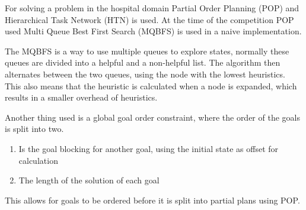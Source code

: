 \documentclass[Main]{subfiles}
\begin{document}
For solving a problem in the hospital domain Partial Order Planning (POP) and Hierarchical Task Network (HTN) is used. At the time of the competition POP used Multi Queue Best First Search (MQBFS) is used in a naive implementation. \par
The MQBFS is a way to use multiple queues to explore states, normally these queues are divided into a helpful and a non-helpful list. The algorithm then alternates between the two queues, using the node with the lowest heuristics. This also means that the heuristic is calculated when a node is expanded, which results in a smaller overhead of heuristics. \par
Another thing used is a global goal order constraint, where the order of the goals is split into two.
\begin{enumerate}
	\item Is the goal blocking for another goal, using the initial state as offset for calculation
	\item The length of the solution of each goal
\end{enumerate}
This allows for goals to be ordered before it is split into partial plans using POP. 
\end{document}
